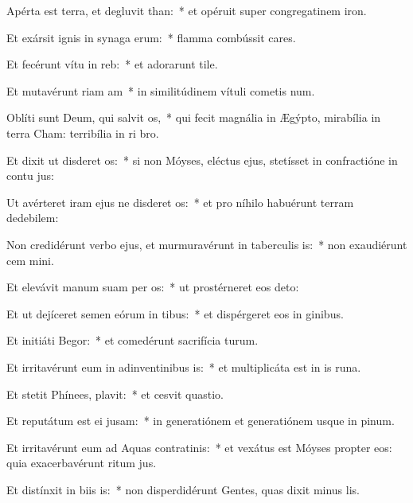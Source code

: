 \item Apérta est terra, et degluvit than:~* et opéruit super congregatinem iron.
\item Et exársit ignis in synaga erum:~* flamma combússit cares.
\item Et fecérunt vítu in reb:~* et adorarunt tile.
\item Et mutavérunt riam am~* in similitúdinem vítuli cometis num.
\item Oblíti sunt Deum, qui salvit os,~* qui fecit magnália in Ægýpto, mirabília in terra Cham: terribília in ri bro.
\item Et dixit ut disderet os:~* si non Móyses, eléctus ejus, stetísset in confractióne in contu jus:
\item Ut avérteret iram ejus ne disderet os:~* et pro níhilo habuérunt terram dedebilem:
\item Non credidérunt verbo ejus, et murmuravérunt in taberculis is:~* non exaudiérunt cem mini.
\item Et elevávit manum suam per os:~* ut prostérneret eos  deto:
\item Et ut dejíceret semen eórum in tibus:~* et dispérgeret eos in ginibus.
\item Et initiáti  Begor:~* et comedérunt sacrifícia turum.
\item Et irritavérunt eum in adinventinibus is:~* et multiplicáta est in is runa.
\item Et stetit Phínees,  plavit:~* et cesvit quastio.
\item Et reputátum est ei  jusam:~* in generatiónem et generatiónem usque in pinum.
\item Et irritavérunt eum ad Aquas contratinis:~* et vexátus est Móyses propter eos: quia exacerbavérunt ritum jus.
\item Et distínxit in biis is:~* non disperdidérunt Gentes, quas dixit minus lis.

